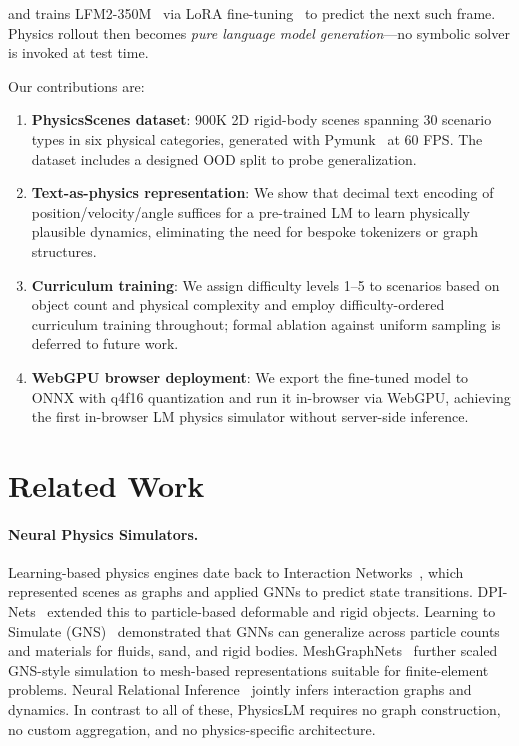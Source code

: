 \documentclass{article}
\begin{document}
\noindent and trains LFM2-350M~\citep{liquideai2024lfm2} via LoRA
fine-tuning~\citep{hu2022lora} to predict the next such frame.
Physics rollout then becomes \emph{pure language model generation}—no symbolic
solver is invoked at test time.

Our contributions are:

\begin{enumerate}[leftmargin=*,topsep=2pt,itemsep=1pt]
  \item \textbf{PhysicsScenes dataset}: 900K 2D rigid-body scenes spanning 30 scenario
    types in six physical categories, generated with Pymunk~\citep{pymunk2024} at 60
    FPS. The dataset includes a designed OOD split to probe generalization.
  \item \textbf{Text-as-physics representation}: We show that decimal text encoding of
    position/velocity/angle suffices for a pre-trained LM to learn physically plausible
    dynamics, eliminating the need for bespoke tokenizers or graph structures.
  \item \textbf{Curriculum training}: We assign difficulty levels 1--5 to scenarios
    based on object count and physical complexity and employ difficulty-ordered
    curriculum training throughout; formal ablation against uniform sampling is
    deferred to future work.
  \item \textbf{WebGPU browser deployment}: We export the fine-tuned model to ONNX
    with q4f16 quantization and run it in-browser via WebGPU, achieving the first
    in-browser LM physics simulator without server-side inference.
\end{enumerate}

\section{Related Work}
\label{sec:related}

\paragraph{Neural Physics Simulators.}
Learning-based physics engines date back to Interaction Networks~\citep{battaglia2016interaction},
which represented scenes as graphs and applied GNNs to predict state transitions.
DPI-Nets~\citep{li2019learning} extended this to particle-based deformable and rigid
objects. Learning to Simulate (GNS)~\citep{sanchez2020learning} demonstrated that
GNNs can generalize across particle counts and materials for fluids, sand, and
rigid bodies. MeshGraphNets~\citep{pfaff2021learning} further scaled GNS-style
simulation to mesh-based representations suitable for finite-element problems.
Neural Relational Inference~\citep{kipf2018neural} jointly infers interaction graphs
and dynamics. In contrast to all of these, PhysicsLM requires no graph
construction, no custom aggregation, and no physics-specific architecture.
\end{document}
